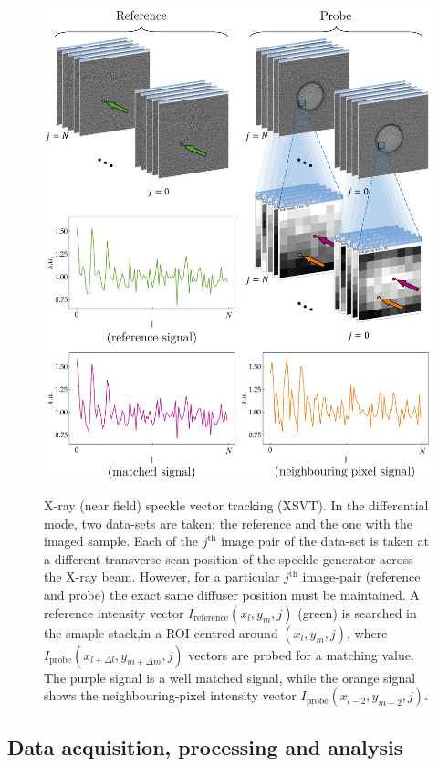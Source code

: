 \begin{refsection}
\begin{figure}[t]
        \centering
        {\includegraphics[width=.7\linewidth]{figures/ch04/speckle_data.pdf}}
        \caption[X-ray (near field) speckle vector tracking (XSVT)]{X-ray (near field) speckle vector tracking (XSVT). In the differential mode, two data-sets are taken: the reference and the one with the imaged sample. Each of the $j^\text{th}$ image pair of the data-set is taken at a different transverse scan position of the speckle-generator across the X-ray beam. However, for a particular $j^\text{th}$ image-pair
        (reference and probe) the exact same diffuser position must be maintained. A reference intensity vector $I_{\text{reference}}(x_l,y_m,j)$ (green) is searched in the smaple stack,in a ROI centred around $(x_l,y_m,j)$, where $I_{\text{probe}}(x_{l+\Delta l},y_{m+\Delta m},j)$ vectors are probed for a matching value. The purple signal is a well matched signal, while the orange signal shows the neighbouring-pixel intensity vector $I_{\text{probe}}(x_{l-2},y_{m-2},j)$.}\label{fig:data_tracking}
\end{figure}

\newpage
\newpage
\subsection{Data acquisition, processing and analysis}\label{sec:data}


\end{refsection}
